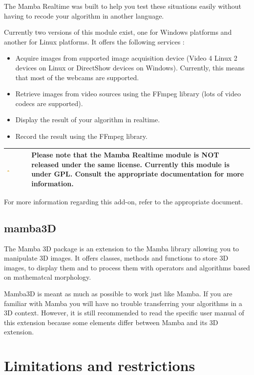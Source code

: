 \documentclass[a4paper,10pt,oneside]{article}
\newenvironment{warnBox}
{
    \begin{center}
    \begin{tabular}{ | b{0.1\textwidth} b{0.8\textwidth} | }
    \hline
    \rowcolor{yellow}
    \includegraphics[width=0.1\textwidth]{Crystal_Clear_app_error.png} &
}
{
    \\
    \hline
    \end{tabular}
    \end{center}
}
\begin{document}
The Mamba Realtime was built to help you test these situations easily without 
having to recode your algorithm in another language.

Currently two versions of this module exist, one for Windows platforms and 
another for Linux platforms. It offers the following services :

\begin{itemize}
\item Acquire images from supported image acquisition device (Video 4 Linux 2
devices on Linux or DirectShow devices on Windows). Currently, this means that
most of the webcams are 
supported.
\item Retrieve images from video sources using the FFmpeg library (lots of video
codecs are supported).
\item Display the result of your algorithm in realtime.
\item Record the result using the FFmpeg library.
\end{itemize}

\begin{warnBox}
Please note that the Mamba Realtime module is \textbf{NOT} released under 
the same license. Currently this module is under GPL. Consult the appropriate
documentation for more information.
\end{warnBox}

For more information regarding this add-on, refer to the appropriate document.

\subsection{mamba3D}

The Mamba 3D package is an extension to the Mamba library allowing you to 
manipulate 3D images. It offers classes, methods and functions to store 3D images, 
to display them and to process them with operators and algorithms based on 
mathematcal morphology.

Mamba3D is meant as much as possible to work just like Mamba. If you are
familiar with Mamba you will have no trouble transferring your algorithms in
a 3D context. However, it is still recommended to read the specific user manual
of this extension because some elements differ between Mamba and its 3D
extension.

\pagebreak

\section{Limitations and restrictions}
\label{cha:lim_restrict}
\end{document}
